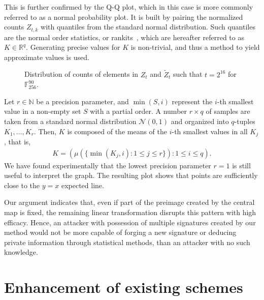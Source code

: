 \documentclass[12pt, a4paper, oneside]{memoir}
\theoremstyle{definition}
\begin{document}
This is further confirmed by the Q-Q plot, which in this case is more commonly referred to as a normal probability plot. It is built by pairing the normalized counts $Z_{t, k}$ with quantiles from the standard normal distribution. Such quantiles are the normal order statistics, or rankits~\cite[p.~349]{Ipsen:194405}, which are hereafter referred to as $K \in \mathbb{R}^{q}$. Generating precise values for $K$ is non-trivial, and thus a method to yield approximate values is used.

\begin{figure}[htbp]
  \caption{Distribution of counts of elements in $Z_{t}$ and
    $\widetilde{Z}_{t}$ such that $t = 2^{16}$ for
    $\mathbb{F}_{256}^{90}$.}\label{fig:dist-plot}
\end{figure}

Let $r \in \mathbb{N}$ be a precision parameter, and $\min(S, i)$ represent the $i$-th smallest value in a non-empty set $S$ with a partial order. A number $r \times q$ of samples are taken from a standard normal distribution $\mathcal{N}(0, 1)$ and organized into $q$-tuples $K_{1}, \dots, K_{r}$. Then, $K$ is composed of the means of the $i$-th smallest values in all $K_{j}$, that is,
\begin{align}
  K = \left( \mu(\{\min(K_{j}, i) : 1 \leq j \leq r\}) : 1 \leq i \leq q \right).
\end{align}
We have found experimentally that the lowest precision parameter $r = 1$ is still useful to interpret the graph. The resulting plot shows that points are sufficiently close to the $y = x$ expected line.

Our argument indicates that, even if part of the preimage created by the central map is fixed, the remaining linear transformation disrupts this pattern with high efficacy. Hence, an attacker with possession of multiple signatures created by our method would not be more capable of forging a new signature or deducing private information through statistical methods, than an attacker with no such knowledge.

\section{Enhancement of existing schemes}\label{sec:exp}
\end{document}
